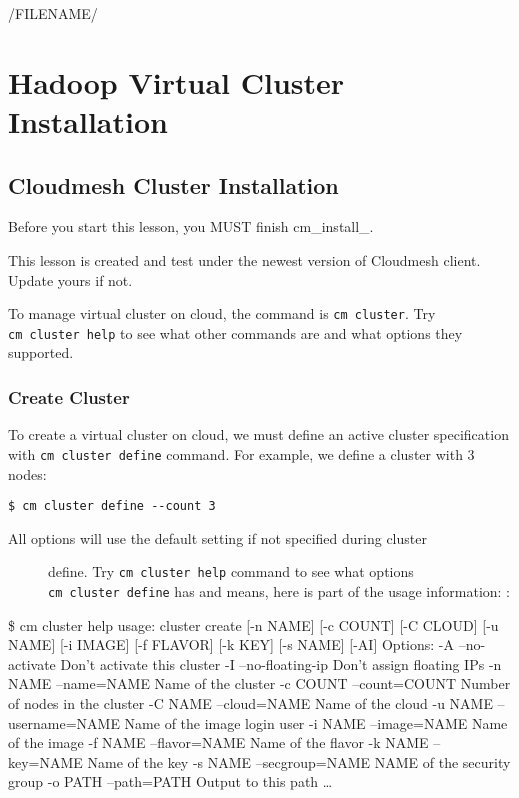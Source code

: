 /FILENAME/
\section{Hadoop Virtual Cluster
Installation}\label{hadoop-virtual-cluster-installation}

\subsection{Cloudmesh Cluster
Installation}\label{cloudmesh-cluster-installation}

Before you start this lesson, you MUST finish cm\_install\_.

This lesson is created and test under the newest version of Cloudmesh
client. Update yours if not.

To manage virtual cluster on cloud, the command is \texttt{cm\ cluster}.
Try \texttt{cm\ cluster\ help} to see what other commands are and what
options they supported.

\subsubsection{Create Cluster}\label{create-cluster}

To create a virtual cluster on cloud, we must define an active cluster
specification with \texttt{cm\ cluster\ define} command. For example, we
define a cluster with 3 nodes:

\begin{verbatim}
$ cm cluster define --count 3
\end{verbatim}

\begin{description}
\item[All options will use the default setting if not specified during
cluster]
define. Try \texttt{cm\ cluster\ help} command to see what options
\texttt{cm\ cluster\ define} has and means, here is part of the usage
information: :
\end{description}

\$ cm cluster help usage: cluster create {[}-n NAME{]} {[}-c COUNT{]}
{[}-C CLOUD{]} {[}-u NAME{]} {[}-i IMAGE{]} {[}-f FLAVOR{]} {[}-k KEY{]}
{[}-s NAME{]} {[}-AI{]} Options: -A --no-activate Don't activate this
cluster -I --no-floating-ip Don't assign floating IPs -n NAME
--name=NAME Name of the cluster -c COUNT --count=COUNT Number of nodes
in the cluster -C NAME --cloud=NAME Name of the cloud -u NAME
--username=NAME Name of the image login user -i NAME --image=NAME Name
of the image -f NAME --flavor=NAME Name of the flavor -k NAME --key=NAME
Name of the key -s NAME --secgroup=NAME NAME of the security group -o
PATH --path=PATH Output to this path \ldots{}

